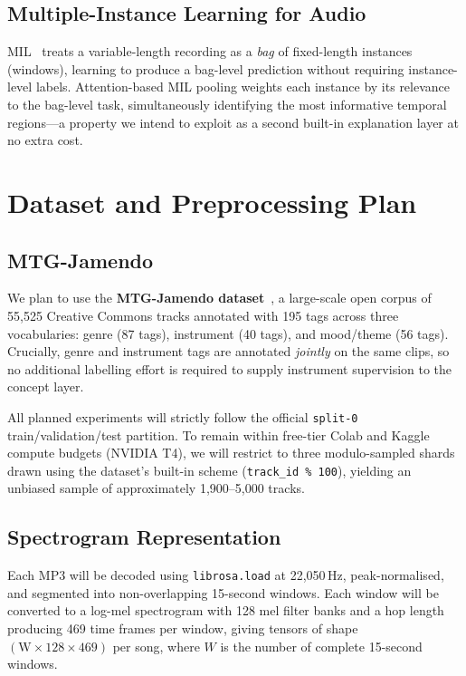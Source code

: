 \documentclass[sigconf,nonacm]{acmart}
\begin{document}
\subsection{Multiple-Instance Learning for Audio}

MIL~\cite{ilse2018mil} treats a variable-length recording as a \emph{bag} of fixed-length
instances (windows), learning to produce a bag-level prediction without requiring instance-level
labels. Attention-based MIL pooling weights each instance by its relevance to the bag-level
task, simultaneously identifying the most informative temporal regions---a property we intend to
exploit as a second built-in explanation layer at no extra cost.

\section{Dataset and Preprocessing Plan}

\subsection{MTG-Jamendo}

We plan to use the \textbf{MTG-Jamendo dataset}~\cite{bogdanov2019mtg}, a large-scale open
corpus of 55,525 Creative Commons tracks annotated with 195 tags across three vocabularies:
genre (87 tags), instrument (40 tags), and mood/theme (56 tags). Crucially, genre and instrument
tags are annotated \emph{jointly} on the same clips, so no additional labelling effort is
required to supply instrument supervision to the concept layer.

All planned experiments will strictly follow the official \texttt{split-0} train/validation/test
partition. To remain within free-tier Colab and Kaggle compute budgets (NVIDIA T4), we will
restrict to three modulo-sampled shards drawn using the dataset's built-in scheme
(\texttt{track\_id\,\%\,100}), yielding an unbiased sample of approximately 1,900--5,000 tracks.

\subsection{Spectrogram Representation}

Each MP3 will be decoded using \texttt{librosa.load} at 22,050\,Hz, peak-normalised, and
segmented into non-overlapping 15-second windows. Each window will be converted to a log-mel
spectrogram with 128 mel filter banks and a hop length producing 469 time frames per window,
giving tensors of shape $(\text{W}\times128\times469)$ per song, where $W$ is the number of
complete 15-second windows.
\end{document}
